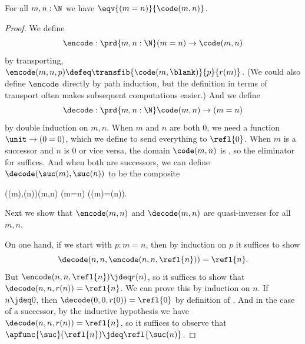 %
\begin{thm}\label{thm:path-nat}
  For all $m,n:\N$ we have $\eqv{(m=n)}{\code(m,n)}$.
\end{thm}

\begin{proof}
  We define
  \[ \encode : \prd{m,n:\N} (m=n) \to \code(m,n) \]
  by transporting, $\encode(m,n,p) \defeq \transfib{\code(m,{\blank})}{p}{r(m)}$.
  (We could also define $\encode$ directly by path induction, but the definition in terms of transport often makes subsequent computations easier.)
  And we define
  \[ \decode : \prd{m,n:\N} \code(m,n) \to (m=n) \]
  by double induction on $m,n$.
  When $m$ and $n$ are both $0$, we need a function $\unit \to (0=0)$, which we define to send everything to $\refl{0}$.
  When $m$ is a successor and $n$ is $0$ or vice versa, the domain $\code(m,n)$ is \emptyt, so the eliminator for \emptyt suffices.
  And when both are successors, we can define $\decode(\suc(m),\suc(n))$ to be the composite
  \begin{narrowmultline*}
    \code(\suc(m),\suc(n))\jdeq\code(m,n)
     \narrowbreak
    (m=n)
    \xrightarrow{\apfunc{\suc}}
    (\suc(m)=\suc(n)).
  \end{narrowmultline*}
  Next we show that $\encode(m,n)$ and $\decode(m,n)$ are quasi-inverses for all $m,n$.

  On one hand, if we start with $p:m=n$, then by induction on $p$ it suffices to show
  \[\decode(n,n,\encode(n,n,\refl{n}))=\refl{n}.\]
  But $\encode(n,n,\refl{n}) \jdeq r(n)$, so it suffices to show that $\decode(n,n,r(n)) =\refl{n}$.
  We can prove this by induction on $n$.
  If $n\jdeq 0$, then $\decode(0,0,r(0)) =\refl{0}$ by definition of \decode.
  And in the case of a successor, by the inductive hypothesis we have $\decode(n,n,r(n)) = \refl{n}$, so it suffices to observe that $\apfunc{\suc}(\refl{n}) \jdeq \refl{\suc(n)}$.


\end{proof}
